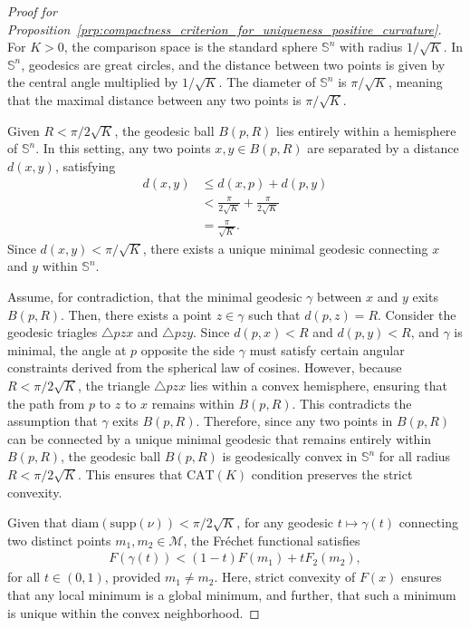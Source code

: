 \begin{proof}[Proof for Proposition~\ref{prp:compactness_criterion_for_uniqueness_positive_curvature}]
    For $K > 0$, the comparison space is the standard sphere $\mathbb{S}^n$ with radius $1 / \sqrt{K}$.
    In $\mathbb{S}^n$, geodesics are great circles, and the distance between two points is given by the central angle multiplied by $1 / \sqrt{K}$.
    The diameter of $\mathbb{S}^n$ is $\pi / \sqrt{K}$, meaning that the maximal distance between any two points is $\pi / \sqrt{K}$.

    Given $R < \pi / 2\sqrt{K}$, the geodesic ball $B(p, R)$ lies entirely within a hemisphere of $\mathbb{S}^n$.
    In this setting, any two points $x, y \in B(p, R)$ are separated by a distance $d(x, y)$, satisfying
    \begin{align*}
        d(x, y) &\leq d(x, p) + d(p, y) \\
        &< \frac{\pi}{2\sqrt{K}} + \frac{\pi}{2\sqrt{K}} \\
        &= \frac{\pi}{\sqrt{K}}.
    \end{align*}
    Since $d(x, y) < \pi / \sqrt{K}$, there exists a unique minimal geodesic connecting $x$ and $y$ within $\mathbb{S}^n$.

    Assume, for contradiction, that the minimal geodesic $\gamma$ between $x$ and $y$ exits $B(p, R)$.
    Then, there exists a point $z \in \gamma$ such that $d(p, z) = R$.
    Consider the geodesic triagles $\triangle pzx$ and $\triangle pzy$.
    Since $d(p, x) < R$ and $d(p, y) < R$, and $\gamma$ is minimal, the angle at $p$ opposite the side $\gamma$ must satisfy certain angular constraints derived from the spherical law of cosines.
    However, because $R < \pi / 2\sqrt{K}$, the triangle $\triangle pzx$ lies within a convex hemisphere, ensuring that the path from $p$ to $z$ to $x$ remains within $B(p, R)$.
    This contradicts the assumption that $\gamma$ exits $B(p, R)$.
    Therefore, since any two points in $B(p, R)$ can be connected by a unique minimal geodesic that remains entirely within $B(p, R)$, the geodesic ball $B(p, R)$ is geodesically convex in $\mathbb{S}^n$ for all radius $R < \pi / 2\sqrt{K}$.
    This ensures that $\mathrm{CAT}(K)$ condition preserves the strict convexity.

    Given that $\mathrm{diam}(\mathrm{supp}(\nu)) < \pi / 2\sqrt{K}$, for any geodesic $t \mapsto \gamma(t)$ connecting two distinct points $m_1, m_2 \in \mathcal{M}$, the Fréchet functional satisfies
    \begin{align*}
        F(\gamma(t)) < (1 - t) F(m_1) + t F_2(m_2),
    \end{align*}
    for all $t \in (0, 1)$, provided $m_1 \neq m_2$.
    Here, strict convexity of $F(x)$ ensures that any local minimum is a global minimum, and further, that such a minimum is unique within the convex neighborhood.
\end{proof}

